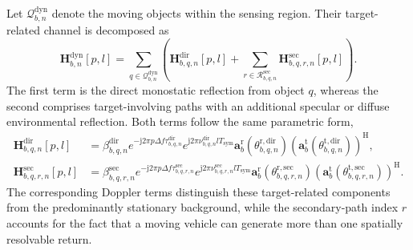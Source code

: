 Let \(\mathcal{Q}^{\mathrm{dyn}}_{b,n}\) denote the moving objects within the
sensing region.  Their target-related channel is decomposed as
\begin{equation}
    \mathbf{H}^{\mathrm{dyn}}_{b,n}[p,l]
    =\sum_{q\in\mathcal{Q}^{\mathrm{dyn}}_{b,n}}
    \left(\mathbf{H}^{\mathrm{dir}}_{b,q,n}[p,l]
    +\sum_{r\in\mathcal{R}^{\mathrm{sec}}_{b,q,n}}
    \mathbf{H}^{\mathrm{sec}}_{b,q,r,n}[p,l]\right).
    \label{eq:system-isac-dynamic-channel}
\end{equation}
The first term is the direct monostatic reflection from object \(q\), whereas
the second comprises target-involving paths with an additional specular or
diffuse environmental reflection.  Both terms follow the same parametric form,
\begin{align}
    \mathbf{H}^{\mathrm{dir}}_{b,q,n}[p,l]
    &=\beta^{\mathrm{dir}}_{b,q,n}
    e^{-\mathrm{j}2\pi p\Delta f\tau^{\mathrm{dir}}_{b,q,n}}
    e^{\mathrm{j}2\pi\nu^{\mathrm{dir}}_{b,q,n}lT_{\mathrm{sym}}}
    \mathbf{a}^{\mathrm{r}}_b\!\left(\theta^{\mathrm{r,dir}}_{b,q,n}\right)
    \left(\mathbf{a}^{\mathrm{t}}_b
    \!\left(\theta^{\mathrm{t,dir}}_{b,q,n}\right)\right)^{\mathrm{H}},
    \label{eq:system-isac-direct-path}\\
    \mathbf{H}^{\mathrm{sec}}_{b,q,r,n}[p,l]
    &=\beta^{\mathrm{sec}}_{b,q,r,n}
    e^{-\mathrm{j}2\pi p\Delta f\tau^{\mathrm{sec}}_{b,q,r,n}}
    e^{\mathrm{j}2\pi\nu^{\mathrm{sec}}_{b,q,r,n}lT_{\mathrm{sym}}}
    \mathbf{a}^{\mathrm{r}}_b\!\left(\theta^{\mathrm{r,sec}}_{b,q,r,n}\right)
    \left(\mathbf{a}^{\mathrm{t}}_b
    \!\left(\theta^{\mathrm{t,sec}}_{b,q,r,n}\right)\right)^{\mathrm{H}}.
    \label{eq:system-isac-secondary-path}
\end{align}
The corresponding Doppler terms distinguish these target-related components
from the predominantly stationary background, while the secondary-path index
\(r\) accounts for the fact that a moving vehicle can generate more than one
spatially resolvable return.

